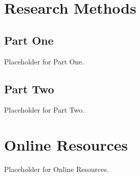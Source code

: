 \appendix

\section{Research Methods}

\subsection{Part One}

Placeholder for Part One.

\subsection{Part Two}

Placeholder for Part Two.

\section{Online Resources}

Placeholder for Online Resources.
